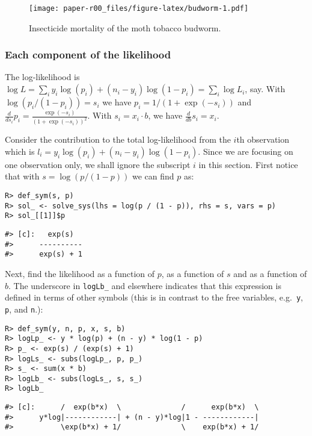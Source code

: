 \begin{figure}
\centering
\texttt{[image: paper-r00\_files/figure-latex/budworm-1.pdf]}
\caption{\label{fig:budworm}Insecticide mortality of the moth tobacco budworm.}
\end{figure}

\hypertarget{each-component-of-the-likelihood}{%
\subsubsection{Each component of the likelihood}\label{each-component-of-the-likelihood}}

The log-likelihood is \(\log L=\sum_i y_i \log(p_i) + (n_i-y_i) \log(1-p_i) = \sum_i \log L_i\), say. With \(\log(p_i/(1-p_i)) = s_i\) we
have \(p_i=1 / (1+ \exp(-s_i))\) and \(\frac d {ds_i} p_i = \frac{\exp(- s_i)}{\left(1 + \exp(- s_i)\right)^{2}}\). With \(s_i = x_i\cdot b\), we
have \(\frac d {db} s_i = x_i\).

Consider the contribution to the total log-likelihood from the \(i\)th
observation which is \(l_i = y_i \log(p_i) + (n_i-y_i) \log(1-p_i)\).
Since we are focusing on one observation only, we shall ignore the
subscript \(i\) in this section. First notice that with
\(s = \log(p/(1-p))\) we can find \(p\) as:

\begin{verbatim}
R> def_sym(s, p)
R> sol_ <- solve_sys(lhs = log(p / (1 - p)), rhs = s, vars = p)
R> sol_[[1]]$p
\end{verbatim}

\begin{verbatim}
#> [c]:   exp(s)  
#>      ----------
#>      exp(s) + 1
\end{verbatim}

Next, find the likelihood as a function of \(p\), as a function of \(s\) and as a function of \(b\).
The underscore in \texttt{logLb\_} and elsewhere indicates that this expression
is defined in terms of other symbols (this is in contrast
to the free variables, e.g.~\texttt{y}, \texttt{p}, and \texttt{n}.):

\begin{verbatim}
R> def_sym(y, n, p, x, s, b)
R> logLp_ <- y * log(p) + (n - y) * log(1 - p)
R> p_ <- exp(s) / (exp(s) + 1)
R> logLs_ <- subs(logLp_, p, p_)
R> s_ <- sum(x * b)
R> logLb_ <- subs(logLs_, s, s_)
R> logLb_
\end{verbatim}

\begin{verbatim}
#> [c]:      /  exp(b*x)  \              /      exp(b*x)  \
#>      y*log|------------| + (n - y)*log|1 - ------------|
#>           \exp(b*x) + 1/              \    exp(b*x) + 1/
\end{verbatim}

